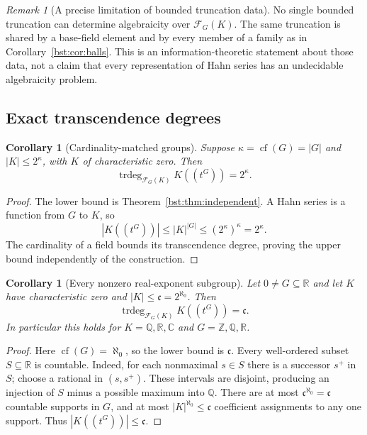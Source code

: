 \documentclass[11pt,letterpaper]{article}
\newtheorem{corollary}[theorem]{Corollary}
\theoremstyle{definition}
\theoremstyle{remark}
\newtheorem{remark}[theorem]{Remark}
\newcommand{\Q}{\mathbb Q}
\newcommand{\R}{\mathbb R}
\newcommand{\C}{\mathbb C}
\newcommand{\Z}{\mathbb Z}
\newcommand{\trdeg}{\operatorname{trdeg}}
\newcommand{\cof}{\operatorname{cf}}
\newcommand{\HH}[2]{#1((t^{#2}))}
\newcommand{\FF}[2]{\mathcal F_{#2}(#1)}
\newcommand{\cc}{\mathfrak c}
\newcommand{\abs}[1]{\lvert #1\rvert}
\begin{document}
\begin{remark}[A precise limitation of bounded truncation data]
No single bounded truncation can determine algebraicity over $\FF KG$.
The same truncation is shared by a base-field element and by every member
of a family as in Corollary~\ref{bst:cor:balls}. This is an information-theoretic
statement about those data, not a claim that every representation of Hahn
series has an undecidable algebraicity problem.
\end{remark}

\subsection{Exact transcendence degrees}

\begin{corollary}[Cardinality-matched groups]\label{bst:cor:exactcard}
Suppose $\kappa=\cof(G)=|G|$ and $\abs K\le2^\kappa$, with $K$ of
characteristic zero. Then
\[
 \trdeg_{\FF KG}\HH KG=2^\kappa.
\]
\end{corollary}
\begin{proof}
The lower bound is Theorem~\ref{bst:thm:independent}. A Hahn series is a function
from $G$ to $K$, so
\[
 |\HH KG|\le |K|^{|G|}\le(2^\kappa)^\kappa=2^\kappa.
\]
The cardinality of a field bounds its transcendence degree, proving the
upper bound independently of the construction.
\end{proof}

\begin{corollary}[Every nonzero real-exponent subgroup]\label{bst:cor:realgroup}
Let $0\ne G\subseteq\R$ and let $K$ have characteristic zero and
$|K|\le\cc=2^{\aleph_0}$. Then
\begin{equation}\label{bst:eq:realtrdeg}
 \trdeg_{\FF KG}\HH KG=\cc.
\end{equation}
In particular this holds for $K=\Q,\R,\C$ and $G=\Z,\Q,\R$.
\end{corollary}
\begin{proof}
Here $\cof(G)=\aleph_0$, so the lower bound is $\cc$. Every well-ordered
subset $S\subseteq\R$ is countable. Indeed, for each nonmaximal $s\in S$
there is a successor $s^+$ in $S$; choose a rational in $(s,s^+)$. These
intervals are disjoint, producing an injection of $S$ minus a possible
maximum into $\Q$. There are at most $\cc^{\aleph_0}=\cc$ countable
supports in $G$, and at most $|K|^{\aleph_0}\le\cc$ coefficient assignments
to any one support. Thus $|\HH KG|\le\cc$.
\end{proof}
\end{document}

